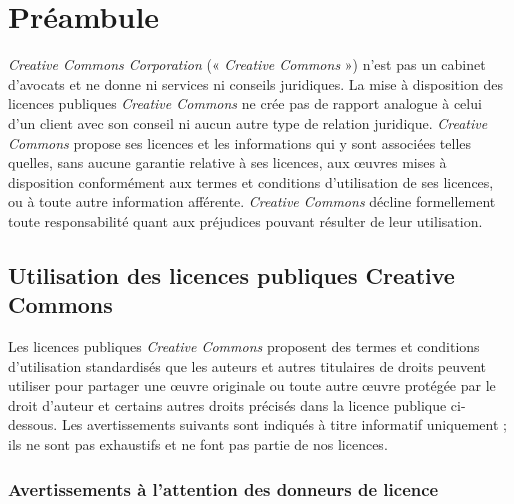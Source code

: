 \label{license}





\section*{Préambule}

\textit{Creative Commons Corporation} (« \textit{Creative Commons} ») n'est pas un cabinet d'avocats et ne donne ni services ni conseils juridiques. La mise à disposition des licences publiques \textit{Creative Commons} ne crée pas de rapport analogue à celui d’un client avec son conseil ni aucun autre type de relation juridique. \textit{Creative Commons} propose ses licences et les informations qui y sont associées telles quelles, sans aucune garantie relative à ses licences, aux œuvres mises à disposition conformément aux termes et conditions d’utilisation de ses licences, ou à toute autre information afférente. \textit{Creative Commons} décline formellement toute responsabilité quant aux préjudices pouvant résulter de leur utilisation.

\subsection*{Utilisation des licences publiques Creative Commons}

Les licences publiques \textit{Creative Commons} proposent des termes et conditions d’utilisation standardisés que les auteurs et autres titulaires de droits peuvent utiliser pour partager une œuvre originale ou toute autre œuvre protégée par le droit d'auteur et certains autres droits précisés dans la licence publique ci-dessous. Les avertissements suivants sont indiqués à titre informatif uniquement ; ils ne sont pas exhaustifs et ne font pas partie de nos licences.

\subsubsection*{Avertissements à l’attention des donneurs de licence}

